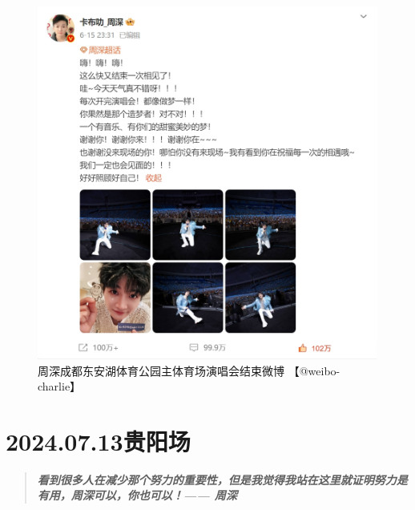 \documentclass[]{ctexbook}
\begin{document}
\begin{figure}

{\centering \includegraphics{img/weibo/chengdu-20240615} 

}

\caption{周深成都东安湖体育公园主体育场演唱会结束微博 【@weibo-charlie】}\label{fig:unnamed-chunk-47}
\end{figure}

\chapter{2024.07.13贵阳场}\label{guiyang-20240713}

\begin{quote}
\textbf{\emph{看到很多人在减少那个努力的重要性，但是我觉得我站在这里就证明努力是有用，周深可以，你也可以！------ 周深}}
\end{quote}
\end{document}
